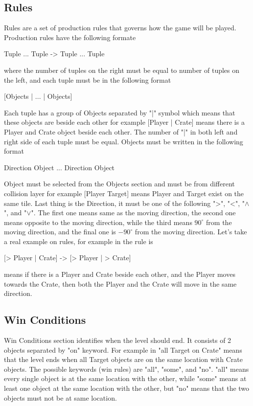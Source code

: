 \subsection{Rules}
Rules are a set of production rules that governs how the game will be played. Production rules have the following formate
\begin{center}{Tuple ... Tuple -> Tuple ... Tuple}\end{center}
where the number of tuples on the right must be equal to number of tuples on the left, and each tuple must be in the following format
\begin{center}{[Objects | ... | Objects]}\end{center}
Each tuple has a group of Objects separated by "|" symbol which means that these objects are beside each other for example [Player | Crate] means there is a Player and Crate object beside each other. The number of "|" in both left and right side of each tuple must be equal. Objects must be written in the following format
\begin{center}{Direction Object ... Direction Object}\end{center}
Object must be selected from the Objects section and must be from different collision layer for example [Player Target] means Player and Target exist on the same tile. Last thing is the Direction, it must be one of the following ">", "<", "$\wedge$", and "$\vee$". The first one means same as the moving direction, the second one means opposite to the moving direction, while the third means $90^{\circ}$ from the moving direction, and the final one is $-90^{\circ}$ from the moving direction. Let's take a real example on rules, for example in  the rule is
\begin{center}{[> Player | Crate] -> [> Player | > Crate]}\end{center}
means if there is a Player and Crate beside each other, and the Player moves towards the Crate, then both the Player and the Crate will move in the same direction.

\subsection{Win Conditions} 
Win Conditions section identifies when the level should end. It consists of 2 objects separated by "on" keyword. For example in  "all Target on Crate" means that the level ends when all Target objects are on the same location with Crate objects. The possible keywords (win rules) are "all", "some", and "no". "all" means every single object is at the same location with the other, while "some" means at least one object at the same location with the other, but "no" means that the two objects must not be at same location.

